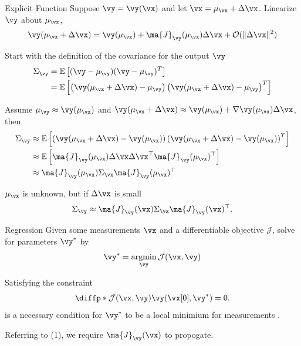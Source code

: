 \documentclass[8pt,aspectratio=169]{beamer}
\begin{document}
\begin{frame}[fragile]{Explicit Function}
  Suppose $\vy = \vy(\vx)$ and let $\vx = \mu_{\vx}+\Delta\vx$. Linearize $\vy$ about $\mu_{\vx}$,
  \[
  \vy(\mu_{\vx}+\Delta\vx)=\vy(\mu_{\vx})+\ma{J}_{\vy}(\mu_{\vx})\Delta \vx + \mathcal{O}(\|\Delta\vx\|^2)
  \]

  Start with the definition of the covariance for the output $\vy$
  \begin{align*}
    \Sigma_{\vy} &= \mathbb{E}\left[(\vy-\mu_{\vy})(\vy-\mu_{\vy})^{T}\right] \\
    &= \mathbb{E}\left[\left(\vy(\mu_{\vx}+\Delta\vx)-\mu_{\vy}\right)\left(\vy(\mu_{\vx}+\Delta\vx)-\mu_{\vy}\right)^{T}\right] 
  \end{align*}

  Assume $\mu_{\vy} \approx \vy(\mu_{\vx})$ and $\vy(\mu_{\vx}+\Delta\vx) \approx \vy(\mu_{\vx})+\nabla \vy(\mu_{\vx})\Delta \vx$, then 
  \begin{align*}
    \Sigma_{\vy} & \approx \mathbb{E}\left[\left(\vy(\mu_{\vx}+\Delta\vx)-\vy(\mu_{\vx})\right)\left(\vy(\mu_{\vx}+\Delta\vx)-\vy(\mu_{\vx})\right)^{T}\right] \\
    & \approx \mathbb{E}\left[\ma{J}_{\vy}(\mu_{\vx})\Delta\vx\Delta\vx^{\T}\ma{J}_{\vy}(\mu_{\vx})^{\T}\right] \\
    & \approx \ma{J}_{\vy}(\mu_{\vx})\Sigma_{\vx}\ma{J}_{\vy}(\mu_{\vx})^{\T}
  \end{align*}
  
  $\mu_{\vx}$ is unknown, but if $\Delta\vx$ is small
  \begin{equation}
    \Sigma_{\vy} \approx \ma{J}_{\vy}(\vx)\Sigma_{\vx}\ma{J}_{\vy}(\vx)^{\T}.
    \label{eq:cov_prop}
  \end{equation}
\end{frame}

\begin{frame}[fragile]{Regression}
  Given some measurements $\vx$ and a differentiable
  objective $\mathcal{J}$, solve for parameters $\vy^{*}$
  by
  \[ \vy^{*} = \argmin_{\vy} \mathcal{J}(\vx,\vy) \]

  Satisfying the constraint
  \[  \diffp*{\mathcal{J}(\vx,\vy)}{\vy}{(\vx[0],\vy^{*})} = 0. \]
  is a necessary condition for $\vy^{*}$ to be a local minimium for
  measurements \vx[0].

  \vspace{1em}

  Referring to (1), we require $\ma{J}_{\vy}(\vx)$ to propogate.
\end{frame}
\end{document}
